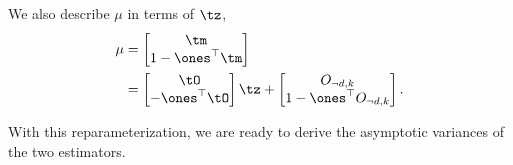 We also describe $\mu$ in terms of $\tz$,
\begin{align*}
  \mu 
  &= 
    \begin{bmatrix}
      \tm \\
      1 - \ones^\top\tm
    \end{bmatrix} \\
    &=
    \begin{bmatrix}
      \tO \\
      - \ones^\top\tO
    \end{bmatrix} \tz 
    + 
    \begin{bmatrix}
      O_{\neg d, k} \\
      1 - \ones^\top O_{\neg d, k}
    \end{bmatrix}.
\end{align*}

With this reparameterization, we are ready to derive the asymptotic
variances of the two estimators.

